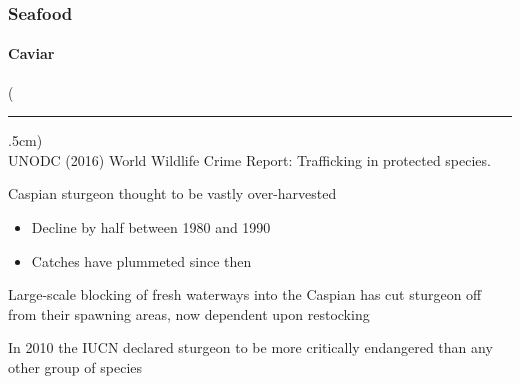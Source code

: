 \documentclass[10pt]{beamer}
\newenvironment{reference}[2]{%
	\begin{textblock*}{\textwidth}(#1,#2)
		\tiny\bgroup\color{gray}}{\egroup\end{textblock*}}
\begin{document}
\begin{frame}[t]
\frametitle{Seafood}
\framesubtitle{Caviar}
\vspace{0.5cm}

	\begin{reference}{4mm}{92mm}
		\rule{1.5cm}{0.25pt}\\
		UNODC (2016) World Wildlife Crime Report: Trafficking in protected species.
	\end{reference}
	
	Caspian sturgeon thought to be vastly over-harvested\\
		\medskip
		\begin{itemize}
			\item Decline by half between 1980 and 1990
			\medskip
			\item Catches have plummeted since then
		\end{itemize}	
	
	\vspace{0.5cm}
	
	Large-scale blocking of fresh waterways into the Caspian has cut sturgeon off from their spawning areas, now dependent upon restocking\\
	
	\vspace{0.5cm}
	
	In 2010 the IUCN declared sturgeon to be more critically endangered than any other group of species\\
\end{frame}
\end{document}
